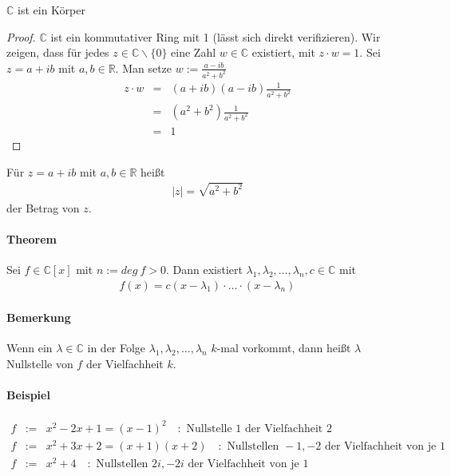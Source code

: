 \begin{propn}
	$ \mathbb{C} $ ist ein Körper
\end{propn}

\begin{proof}
	$ \mathbb{C} $ ist ein kommutativer Ring mit 1 (lässt sich direkt verifizieren).
	Wir zeigen, dass für jedes $ z \in \mathbb{C} \backslash \{0\} $ eine Zahl $ w \in \mathbb{C} $ existiert, mit $ z \cdot w = 1 $. Sei $ z = a+ib $ mit $ a,b \in \mathbb{R} $. Man setze $ w := \frac{a-ib}{a^2+b^2} $
	\begin{eqnarray*}
		z \cdot w &=& (a+ib)(a-ib) \frac{1}{a^2+b^2} \\
			&=& (a^2 + b^2) \frac{1}{a^2+b^2} \\
			&=& 1  
	\end{eqnarray*}
\end{proof}
 
 Für $ z = a+ib $ mit $ a,b \in \mathbb{R} $ heißt
 \begin{eqnarray*}
 	|z| =\sqrt{a^2+b^2}
 \end{eqnarray*}
 der Betrag von $ z $.
 
 \paragraph{Theorem}
 Sei $ f \in \mathbb{C}[x] $ mit $ n := deg~f > 0 $. Dann existiert $ \lambda_1, \lambda_2, \ldots, \lambda_n, c  \in \mathbb{C} $ mit
 \begin{align*}
 	f(x) = c(x-\lambda_1) \cdot \ldots \cdot (x - \lambda_n)
 \end{align*}
 
 \paragraph{Bemerkung}
 Wenn ein $ \lambda \in \mathbb{C} $ in der Folge $ \lambda_1, \lambda_2, \ldots, \lambda_n $ $ k $-mal vorkommt, dann heißt $ \lambda $ Nullstelle von $ f $ der Vielfachheit $ k $.
 
 \paragraph{Beispiel}
 \begin{eqnarray*}
	f &:=& x^2 -2x +1 = (x-1)^2 \quad : \text{ Nullstelle } 1  \text{ der Vielfachheit } 2 \\
 	f &:=& x^2 +3x +2 = (x+1)(x+2) \quad : \text{ Nullstellen } -1, -2  \text{ der Vielfachheit von je } 1 \\
 	f &:=& x^2 +4 \quad : \text{ Nullstellen } 2i, -2i  \text{ der Vielfachheit von je } 1
 \end{eqnarray*}
 
